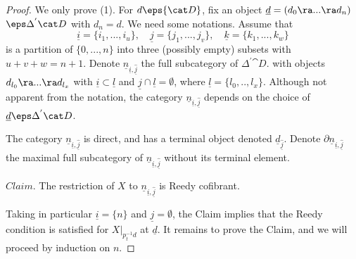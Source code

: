 \begin{proof}
We only prove (1). For $d \eps {\cat D}$, fix an object $\underline{d} = (d_0 \ra ... \ra d_n)$ $\eps \Delta^{'}{\cat D}$ with $d_n = d$. We need some notations. Assume that 
\[
\underline{i} = \{i_1, ..., i_u \}, \,\,\,\,\,\, \underline{j} = \{j_1, ..., j_v \}, \,\,\,\,\,\, \underline{k} = \{k_1, ..., k_w \} 
\]
is a partition of $\{0, ..., n \}$ into three (possibly empty) subsets with $u + v + w = n+1$. Denote $\underline{n}_{\underline{i}, \underline{\widehat{j}}}$ the full subcategory of $\Delta^{'}{\cat D}$. with objects $d_{l_0} \ra ... \ra d_{l_x}$ with $\underline{i} \subset \underline{l}$ and $\underline{j} \cap \underline{l} = \emptyset$, where $\underline{l} = \{l_0, .., l_x \}$. Although not apparent from the notation, the category $\underline{n}_{\underline{i}, \underline{\widehat{j}}}$ depends on the choice of $\underline{d} \eps \Delta^{'}{\cat D}$.

The category $\underline{n}_{\underline{i}, \underline{\widehat{j}}}$ is direct, and has a terminal object denoted $\underline{d}_{\underline{\widehat{j}}}$. Denote $\partial \underline{n}_{\underline{i}, \underline{\widehat{j}}}$ the maximal full subcategory of $\underline{n}_{\underline{i}, \underline{\widehat{j}}}$ without its terminal element.

$Claim.$ The restriction of $X$ to $\underline{n}_{\underline{i}, \underline{\widehat{j}}}$ is Reedy cofibrant.

Taking in particular $\underline{i} = \{ n \}$ and $\underline{j} = \emptyset$, the Claim implies that the Reedy condition is satisfied for $X|_{p_t^{-1}d}$ at $\underline{d}$. It remains to prove the Claim, and we will proceed by induction on $n$.


\end{proof}
